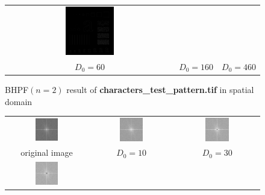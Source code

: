 \documentclass[11pt,a4paper]{article}
\begin{document}
\begin{figure}[!htbp]
\begin{tabular}{ccc}
		\includegraphics[width=0.3\textwidth]{pro3/BHPF/BHPF_460} \\
		 $D_0=60$ &  $D_0=160$ &  $D_0=460$
	\end{tabular}
	\caption{BHPF$(n=2)$ result of \textbf{characters\_test\_pattern.tif} in spatial domain}
	\label{pro3_fig5}
\end{figure}

\begin{figure}[!htbp]
	\centering
	\begin{tabular}{ccc} 
		\includegraphics[width=0.3\textwidth]{pro3/org_spectrum}&
		\includegraphics[width=0.3\textwidth]{pro3/BHPF/BHPF_10_spectrum}&
		\includegraphics[width=0.3\textwidth]{pro3/BHPF/BHPF_30_spectrum} \\
		original image &  $D_0=10$ &  $D_0=30$\\
		\includegraphics[width=0.3\textwidth]{pro3/BHPF/BHPF_60_spectrum}&

\end{tabular}
\end{figure}
\end{document}
